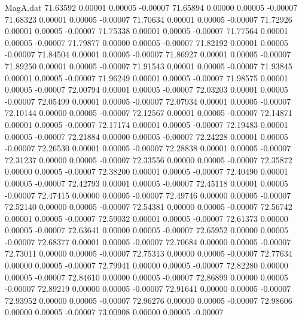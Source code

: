 \begin{filecontents}{MagA.dat}
  71.63592    0.00001    0.00005   -0.00007
  71.65894    0.00000    0.00005   -0.00007
  71.68323    0.00001    0.00005   -0.00007
  71.70634    0.00001    0.00005   -0.00007
  71.72926    0.00001    0.00005   -0.00007
  71.75338    0.00001    0.00005   -0.00007
  71.77564    0.00001    0.00005   -0.00007
  71.79877    0.00000    0.00005   -0.00007
  71.82192    0.00001    0.00005   -0.00007
  71.84504    0.00001    0.00005   -0.00007
  71.86927    0.00001    0.00005   -0.00007
  71.89250    0.00001    0.00005   -0.00007
  71.91543    0.00001    0.00005   -0.00007
  71.93845    0.00001    0.00005   -0.00007
  71.96249    0.00001    0.00005   -0.00007
  71.98575    0.00001    0.00005   -0.00007
  72.00794    0.00001    0.00005   -0.00007
  72.03203    0.00001    0.00005   -0.00007
  72.05499    0.00001    0.00005   -0.00007
  72.07934    0.00001    0.00005   -0.00007
  72.10144    0.00000    0.00005   -0.00007
  72.12567    0.00001    0.00005   -0.00007
  72.14871    0.00001    0.00005   -0.00007
  72.17174    0.00001    0.00005   -0.00007
  72.19483    0.00001    0.00005   -0.00007
  72.21884    0.00000    0.00005   -0.00007
  72.24228    0.00001    0.00005   -0.00007
  72.26530    0.00001    0.00005   -0.00007
  72.28838    0.00001    0.00005   -0.00007
  72.31237    0.00000    0.00005   -0.00007
  72.33556    0.00000    0.00005   -0.00007
  72.35872    0.00000    0.00005   -0.00007
  72.38200    0.00001    0.00005   -0.00007
  72.40490    0.00001    0.00005   -0.00007
  72.42793    0.00001    0.00005   -0.00007
  72.45118    0.00001    0.00005   -0.00007
  72.47415    0.00000    0.00005   -0.00007
  72.49746    0.00000    0.00005   -0.00007
  72.52140    0.00000    0.00005   -0.00007
  72.54381    0.00000    0.00005   -0.00007
  72.56742    0.00001    0.00005   -0.00007
  72.59032    0.00001    0.00005   -0.00007
  72.61373    0.00000    0.00005   -0.00007
  72.63641    0.00000    0.00005   -0.00007
  72.65952    0.00000    0.00005   -0.00007
  72.68377    0.00001    0.00005   -0.00007
  72.70684    0.00000    0.00005   -0.00007
  72.73011    0.00000    0.00005   -0.00007
  72.75313    0.00000    0.00005   -0.00007
  72.77634    0.00000    0.00005   -0.00007
  72.79941    0.00000    0.00005   -0.00007
  72.82280    0.00000    0.00005   -0.00007
  72.84610    0.00000    0.00005   -0.00007
  72.86899    0.00000    0.00005   -0.00007
  72.89219    0.00000    0.00005   -0.00007
  72.91641    0.00000    0.00005   -0.00007
  72.93952    0.00000    0.00005   -0.00007
  72.96276    0.00000    0.00005   -0.00007
  72.98606    0.00000    0.00005   -0.00007
  73.00908    0.00000    0.00005   -0.00007

\end{filecontents}
